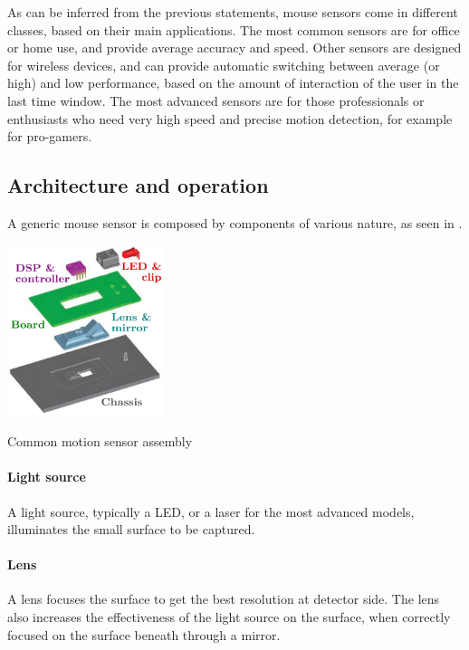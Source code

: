 \documentclass[a4paper,10pt]{article}
\makeatletter
\newenvironment{figurehere}{\def\@captype{figure}\vspace{2ex}}{\vspace{2ex}}
\makeatother
\begin{document}
\begin{multicols}{2}
As can be inferred from the previous statements, mouse sensors come in
different classes, based on their main applications. The most common sensors
are for office or home use, and provide average accuracy and speed. Other
sensors are designed for wireless devices, and can provide automatic switching
between average (or high) and low performance, based on the amount of
interaction of the user in the last time window. The most advanced sensors are
for those professionals or enthusiasts who need very high speed and precise
motion detection, for example for pro-gamers.


\subsection{Architecture and operation}

A generic mouse sensor is composed by components of various nature, as seen
in .

\begin{figurehere}
	\centering
	\includegraphics[keepaspectratio=true,height=5cm]{images/sensor_assembly.pdf}
	\caption{Common motion sensor assembly}
	\label{fig:sensor_assembly}
\end{figurehere}


\paragraph{Light source}
A light source, typically a LED, or a laser for the most advanced models,
illuminates the small surface to be captured.


\paragraph{Lens}
A lens focuses the surface to get the best resolution at detector side.
The lens also increases the effectiveness of the light source on the surface,
when correctly focused on the surface beneath through a mirror.


\end{multicols}
\end{document}
